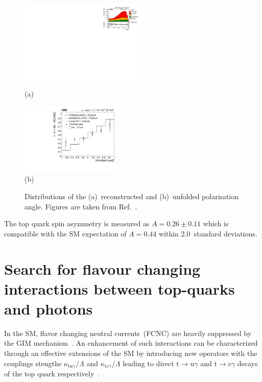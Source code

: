 \documentclass{PoS}
\begin{document}
\begin{figure}[htbp]
\begin{center}
\parbox[t]{0.55\textwidth}{\centering\includegraphics[width=0.54\textwidth]{figures/polarization/2j1t_cos_theta.pdf}\\(a)}
\parbox[t]{0.44\textwidth}{\centering\includegraphics[width=0.43\textwidth]{figures/polarization/cos_theta_unfolded.pdf}\\(b)}
\caption{\label{fig:costheta}Distributions of the (a)~reconstructed and (b)~unfolded polarisation angle. Figures are taken from Ref.~\cite{CMS-PAS-TOP-13-001}.}
\end{center}
\end{figure}

The top quark spin asymmetry is measured as $A=0.26\pm0.11$ which is compatible with the SM expectation of $A=0.44$ within 2.0~standard deviations.


\section{Search for flavour changing interactions between top-quarks and photons}

In the SM, flavor changing neutral currents~(FCNC) are heavily suppressed by the GIM mechanism~\cite{fcnc}. An enhancement of such interactions can be characterized through an effective extensions of the SM by introducing new operators with the couplings stengths $\kappa_{\mathrm{tu}\gamma}/\Lambda$ and $\kappa_{\mathrm{tc}\gamma}/\Lambda$ leading to direct $\mathrm{t}\to\mathrm{u}\gamma$ and $\mathrm{t}\to\mathrm{c}\gamma$ decays of the top quark respectively~\cite{minimal-anom-set}. 
\end{document}
